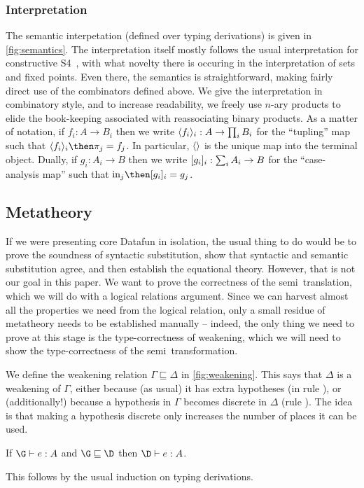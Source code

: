 \subsubsection{Interpretation} The semantic interpetation (defined
over typing derivations) is given in \cref{fig:semantics}.
%
The interpretation itself mostly follows the usual interpretation for
constructive S4~\cite{depaiva-s4}, with what novelty there is occuring in the
interpretation of sets and fixed points.
%
Even there, the semantics is straightforward, making fairly direct use of the
combinators defined above.
%
We give the interpretation in combinatory style, and to increase readability, we
freely use $n$-ary products to elide the book-keeping associated with
reassociating binary products.
%
As a matter of notation, if $f_i : A \to B_i$ then we write $\langle{f_i}\rangle_i : A
\to \prod_i B_i$ for the ``tupling'' map such that $\fork{f_i}_i \then \pi_j =
f_j$.
%
In particular, $\langle{}\rangle$ is the unique map into the terminal object.
%
Dually, if $g_i : A_i \to B$ then we write $[{g_i}]_i : \sum_i A_i
\to B$ for the ``case-analysis map'' such that $\injc_j \then \krof{g_i}_i =
g_j$.


\subsection{Metatheory}
\label{sec:weakening}

If we were presenting core Datafun in isolation, the usual thing to do would be
to prove the soundness of syntactic substitution, show that syntactic and
semantic substitution agree, and then establish the equational theory. However,
that is not our goal in this paper. We want to prove the correctness of the
semi\naive\ translation, which we will do with a logical relations argument.
Since we can harvest almost all the properties we need from the logical
relation, only a small residue of metatheory needs to be established manually --
indeed, the only thing we need to prove at this stage is the type-correctness of
weakening, which we will need to show the type-correctness of the
semi\naive\ transformation.

We define the weakening relation $\Gamma \sqsubseteq \Delta$ in
\cref{fig:weakening}. This says that $\Delta$ is a weakening of $\Gamma$, either
because (as usual) it has extra hypotheses (in rule ), or
(additionally!) because a hypothesis in $\Gamma$ becomes discrete in $\Delta$
(rule ). The idea is that making a hypothesis discrete only increases
the number of places it can be used.

\begin{lemma}\label{thm:weaken}
  If $\J e \G A$ and $\G \sqsubseteq \D$ then $\J e \D A$.
\end{lemma}

\noindent This follows by the usual induction on typing derivations.


